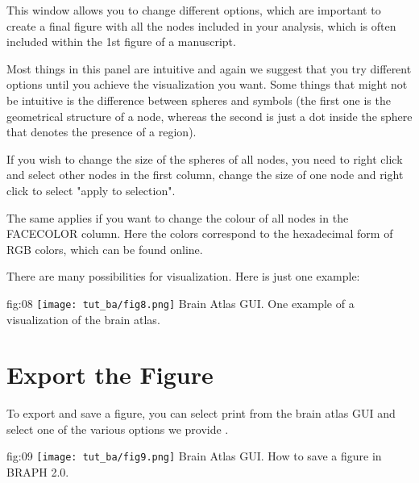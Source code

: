 \documentclass[justified]{tufte-handout}
\begin{document}
This window allows you to change different options, which are important to create a final figure with all the nodes included in your analysis, which is often included within the 1st figure of a manuscript.

Most things in this panel are intuitive and again we suggest that you try different options until you achieve the visualization you want.
Some things that might not be intuitive is the difference between spheres and symbols (the first one is the geometrical structure of a node, whereas the second is just a dot inside the sphere that denotes the presence of a region). 

If you wish to change the size of the spheres of all nodes, you need to right click and select other nodes in the first column, change the size of one node and right click to select "apply to selection".

The same applies if you want to change the colour of all nodes in the FACECOLOR column. Here the colors correspond to the hexadecimal form of RGB colors, which can be found online.

There are many possibilities for visualization. Here is just one example:

	{fig:08}
	{\texttt{[image: tut\_ba/fig8.png]}}
	{Brain Atlas GUI.}
	{
	One example of a visualization of the brain atlas. 
	}

\clearpage
\section{Export the Figure}

To export and save a figure, you can select print from the brain atlas GUI and select one of the various options we provide .

	{fig:09}
	{\texttt{[image: tut\_ba/fig9.png]}}
	{Brain Atlas GUI.}
	{
	How to save a figure in BRAPH 2.0. 
	}
\end{document}
